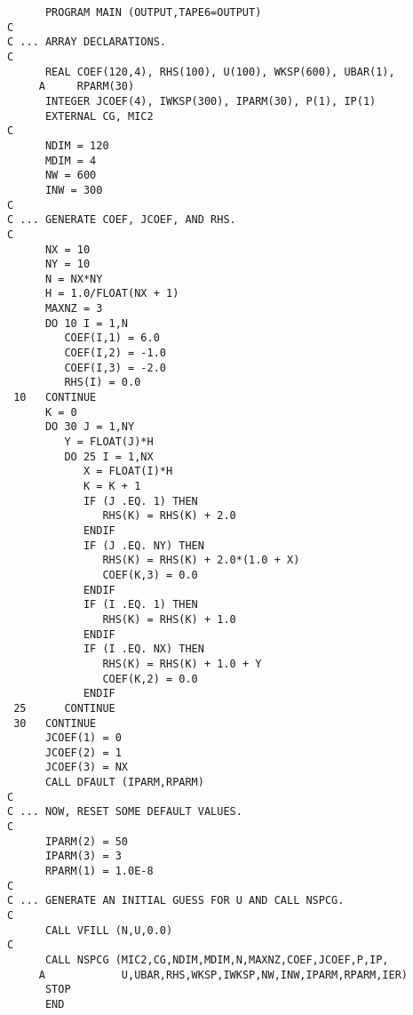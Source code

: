 \begin{verbatim}
      PROGRAM MAIN (OUTPUT,TAPE6=OUTPUT)
C
C ... ARRAY DECLARATIONS.
C
      REAL COEF(120,4), RHS(100), U(100), WKSP(600), UBAR(1),
     A     RPARM(30)
      INTEGER JCOEF(4), IWKSP(300), IPARM(30), P(1), IP(1)
      EXTERNAL CG, MIC2
C
      NDIM = 120
      MDIM = 4
      NW = 600
      INW = 300
C
C ... GENERATE COEF, JCOEF, AND RHS.
C
      NX = 10
      NY = 10
      N = NX*NY
      H = 1.0/FLOAT(NX + 1)
      MAXNZ = 3
      DO 10 I = 1,N 
         COEF(I,1) = 6.0
         COEF(I,2) = -1.0
         COEF(I,3) = -2.0
         RHS(I) = 0.0
 10   CONTINUE
      K = 0
      DO 30 J = 1,NY
         Y = FLOAT(J)*H
         DO 25 I = 1,NX
            X = FLOAT(I)*H
            K = K + 1
            IF (J .EQ. 1) THEN
               RHS(K) = RHS(K) + 2.0
            ENDIF
            IF (J .EQ. NY) THEN
               RHS(K) = RHS(K) + 2.0*(1.0 + X)
               COEF(K,3) = 0.0
            ENDIF
            IF (I .EQ. 1) THEN
               RHS(K) = RHS(K) + 1.0
            ENDIF
            IF (I .EQ. NX) THEN
               RHS(K) = RHS(K) + 1.0 + Y
               COEF(K,2) = 0.0
            ENDIF
 25      CONTINUE
 30   CONTINUE
      JCOEF(1) = 0
      JCOEF(2) = 1
      JCOEF(3) = NX 
      CALL DFAULT (IPARM,RPARM)
C
C ... NOW, RESET SOME DEFAULT VALUES.
C
      IPARM(2) = 50 
      IPARM(3) = 3
      RPARM(1) = 1.0E-8
C
C ... GENERATE AN INITIAL GUESS FOR U AND CALL NSPCG.
C
      CALL VFILL (N,U,0.0)
C
      CALL NSPCG (MIC2,CG,NDIM,MDIM,N,MAXNZ,COEF,JCOEF,P,IP,
     A            U,UBAR,RHS,WKSP,IWKSP,NW,INW,IPARM,RPARM,IER)
      STOP
      END 
\end{verbatim}


